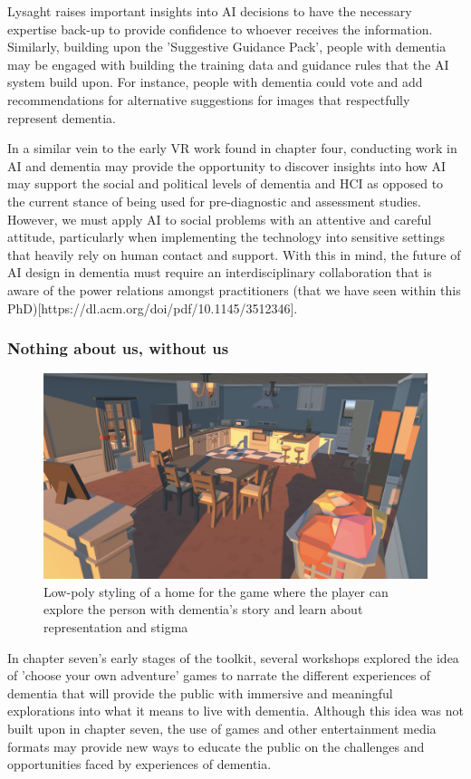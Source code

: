 Lysaght raises important insights into AI decisions to have the necessary expertise back-up to provide confidence to whoever receives the information. Similarly, building upon the 'Suggestive Guidance Pack', people with dementia may be engaged with building the training data and guidance rules that the AI system build upon. For instance, people with dementia could vote and add recommendations for alternative suggestions for images that respectfully represent dementia.

In a similar vein to the early VR work found in chapter four, conducting work in AI and dementia may provide the opportunity to discover insights into how AI may support the social and political levels of dementia and HCI as opposed to the current stance of being used for pre-diagnostic and assessment studies. However, we must apply AI to social problems with an attentive and careful attitude, particularly when implementing the technology into sensitive settings that heavily rely on human contact and support. With this in mind, the future of AI design in dementia must require an interdisciplinary collaboration that is aware of the power relations amongst practitioners (that we have seen within this PhD)[https://dl.acm.org/doi/pdf/10.1145/3512346].

\subsubsection{Nothing about us, without us}
\label{FutureStudyFour}
\begin{figure}[htp]
\centering
\includegraphics[width=1\linewidth]{Images/Discussion/Storytellling_Game.png}
\caption{Low-poly styling of a home for the game where the player can explore the person with dementia's story and learn about representation and stigma}
\label{fig:StorytellingLowPoly}
\end{figure}
In chapter seven's early stages of the toolkit, several workshops explored the idea of 'choose your own adventure' games to narrate the different experiences of dementia that will provide the public with immersive and meaningful explorations into what it means to live with dementia. Although this idea was not built upon in chapter seven, the use of games and other entertainment media formats may provide new ways to educate the public on the challenges and opportunities faced by experiences of dementia. 

